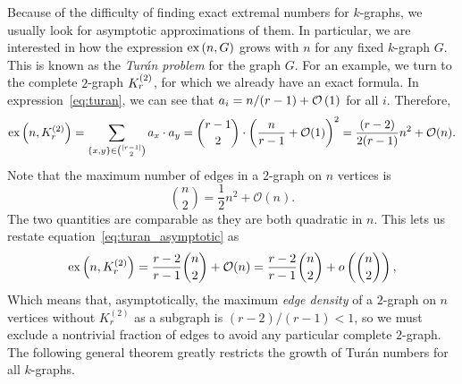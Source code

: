 Because of the difficulty of finding exact extremal numbers for $k$-graphs,
we usually look for asymptotic approximations of them.
In particular, we are interested in how the expression
$\text{ex} \left( n, G \right)$ grows with $n$ for any fixed $k$-graph $G$.
This is known as the \emph{Turán problem} for the graph $G$.
For an example, we turn to the complete $2$-graph $K^{(2)}_{r}$,
for which we already have an exact formula.
In expression~\eqref{eq:turan}, we can see that
$a_i = n/(r-1) + \mathcal{O}\left(1\right)$ for all $i$.
Therefore,
\begin{equation} \label{eq:turan_asymptotic}
    \text{ex} \left( n, K^{(2)}_{r} \right) = \sum_{\{x, y\} \in \binom{[r-1]}{2}} a_x \cdot a_y
    = \binom{r-1}{2} \cdot \left( \frac{n}{r-1} + \mathcal{O}(1) \right)^2
    = \frac{(r-2)}{2(r-1)} n^2 + \mathcal{O}(n).
\end{equation}
Note that the maximum number of edges in a $2$-graph on $n$ vertices is
\[
    \binom{n}{2} = \frac{1}{2} n^2 + \mathcal{O}(n).
\]
The two quantities are comparable as they are both quadratic in $n$.
This lets us restate equation~\eqref{eq:turan_asymptotic} as
\begin{equation} \label{eq:turan_asymptotic_density}
    \text{ex} \left( n, K^{(2)}_{r} \right) =
    \frac{r-2}{r-1} \binom{n}{2} + \mathcal{O}(n) =
    \frac{r-2}{r-1} \binom{n}{2} + o\left(\binom{n}{2}\right),
\end{equation}
Which means that, asymptotically, the maximum \emph{edge density} of a $2$-graph on $n$ vertices
without $K_r^{(2)}$ as a subgraph is $(r-2)/(r-1) < 1$, so we must exclude a nontrivial fraction of edges
to avoid any particular complete $2$-graph.
The following general theorem greatly restricts the growth of Turán numbers
for all $k$-graphs.

